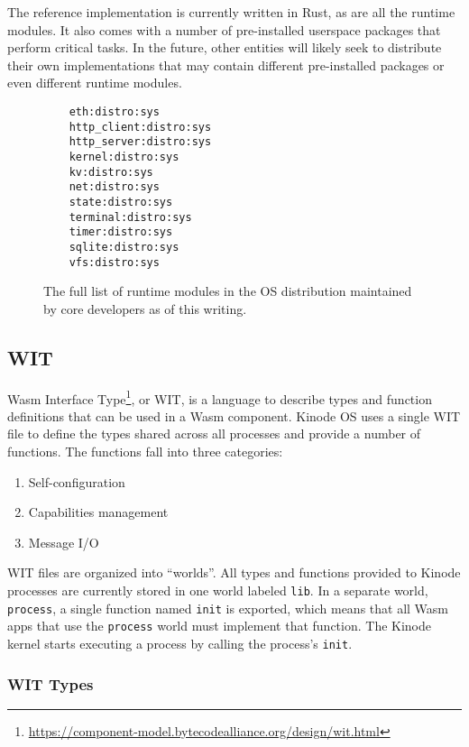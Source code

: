 \documentclass[runningheads]{llncs}
\begin{document}
The reference implementation is currently written in Rust, as are all the runtime modules.
It also comes with a number of pre-installed userspace packages that perform critical tasks.
In the future, other entities will likely seek to distribute their own implementations that may contain different pre-installed packages or even different runtime modules.

\begin{figure}
    \centering
    \begin{lstlisting}
    eth:distro:sys
    http_client:distro:sys
    http_server:distro:sys
    kernel:distro:sys
    kv:distro:sys
    net:distro:sys
    state:distro:sys
    terminal:distro:sys
    timer:distro:sys
    sqlite:distro:sys
    vfs:distro:sys
    \end{lstlisting}
    \caption{The full list of runtime modules in the OS distribution maintained by core developers as of this writing.}
    \label{fig:runtime modules list}
\end{figure}

\subsection{WIT}
\label{sec:oswit}

Wasm Interface Type\footnote{\url{https://component-model.bytecodealliance.org/design/wit.html}}, or WIT, is a language to describe types and function definitions that can be used in a Wasm component.
Kinode OS uses a single WIT file to define the types shared across all processes and provide a number of functions.
The functions fall into three categories:
\begin{enumerate}
    \item Self-configuration
    \item Capabilities management
    \item Message I/O
\end{enumerate}

WIT files are organized into ``worlds''.
All types and functions provided to Kinode processes are currently stored in one world labeled \verb|lib|.
In a separate world, \verb|process|, a single function named \verb|init| is exported, which means that all Wasm apps that use the \verb|process| world must implement that function.
The Kinode kernel starts executing a process by calling the process's \verb|init|.

\subsubsection{WIT Types}
\label{sec:oswittypes}
\end{document}
